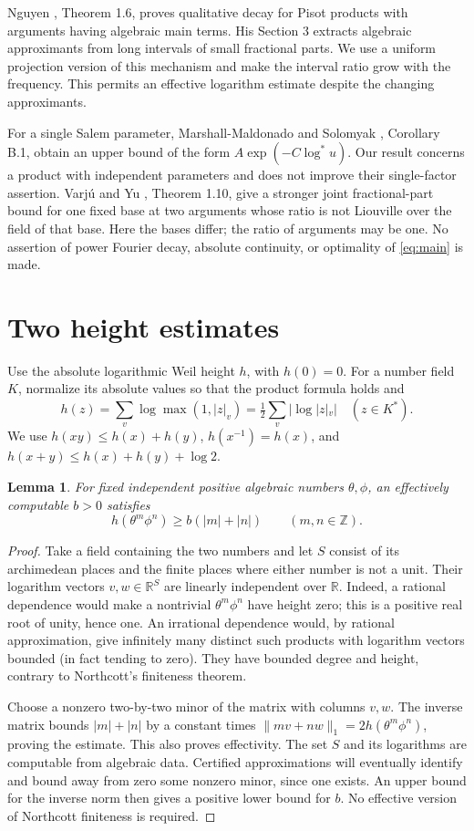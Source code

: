 \documentclass[11pt]{article}
\newtheorem{lemma}[theorem]{Lemma}
\newcommand{\Z}{\mathbb Z}
\newcommand{\R}{\mathbb R}
\begin{document}
Nguyen \cite{Nguyen}, Theorem 1.6, proves qualitative decay for Pisot
products with arguments having algebraic main terms. His Section 3
extracts algebraic approximants from long intervals of small fractional
parts. We use a uniform projection version of this mechanism and make
the interval ratio grow with the frequency. This permits an effective
logarithm estimate despite the changing approximants.

For a single Salem parameter, Marshall-Maldonado and Solomyak
\cite{MMS}, Corollary B.1, obtain an upper bound of the form
$A\exp(-C\log^*u)$. Our result concerns a product with independent
parameters and does not improve their single-factor assertion.
Varj\'u and Yu \cite{VY}, Theorem 1.10, give a stronger joint
fractional-part bound for one fixed base at two arguments whose ratio
is not Liouville over the field of that base. Here the bases differ;
the ratio of arguments may be one. No assertion of power Fourier
decay, absolute continuity, or optimality of \eqref{eq:main} is made.

\section{Two height estimates}
Use the absolute logarithmic Weil height $h$, with $h(0)=0$. For a number field $K$,
normalize its absolute values so that the product formula holds and
\[
 h(z)=\sum_v\log\max(1,|z|_v)
      =\tfrac12\sum_v|\log|z|_v|\quad(z\in K^*).
\]
We use $h(xy)\leq h(x)+h(y)$, $h(x^{-1})=h(x)$, and
$h(x+y)\leq h(x)+h(y)+\log2$.

\begin{lemma}\label{lem:height}
For fixed independent positive algebraic numbers $\theta,\phi$, an
effectively computable $b>0$ satisfies
\begin{equation}\label{eq:height}
 h(\theta^m\phi^n)\geq b(|m|+|n|)\qquad(m,n\in\Z).
\end{equation}
\end{lemma}
\begin{proof}
Take a field containing the two numbers and let $S$ consist of its
archimedean places and the finite places where either number is not a
unit. Their logarithm vectors $v,w\in\R^S$ are linearly independent
over $\R$. Indeed, a rational dependence would make a nontrivial
$\theta^m\phi^n$ have height zero; this is a positive real root of
unity, hence one. An irrational dependence would, by rational
approximation, give infinitely many distinct such products with
logarithm vectors bounded (in fact tending to zero). They have bounded
degree and height, contrary to Northcott's finiteness theorem.

Choose a nonzero two-by-two minor of the matrix with columns $v,w$.
The inverse matrix bounds $|m|+|n|$ by a constant times
$\|mv+nw\|_1=2h(\theta^m\phi^n)$, proving the estimate.
This also proves effectivity. The set $S$ and its logarithms are
computable from algebraic data. Certified approximations will eventually
identify and bound away from zero some nonzero minor, since one exists.
An upper bound for the inverse norm then gives a positive lower bound
for $b$. No effective version of Northcott finiteness is required.
\end{proof}
\end{document}

